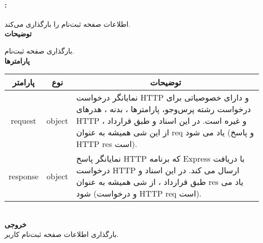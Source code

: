 \paragraph{:}
اطلاعات صفحه ثبت‌نام را بارگذاری می‌کند.
\\
\textbf{توضیحات}
\hr
\begin{flushleft}
	\framebox[.9\textwidth][l]{
		\lr{
			\textcolor{type}{void}
			\textcolor{func}{getRegister}
			\textcolor{symb}{(}
			\textcolor{type}{object}
			\textcolor{arg}{request}
			\textcolor{symb}{,}
			\textcolor{type}{object}
			\textcolor{arg}{response}
			\textcolor{symb}{);}
		}
	}
\end{flushleft}
بارگذاری صفحه ثبت‌نام. 
\\
\textbf{پارامترها}
\hr \\[10pt]
\begin{tabular}{|m{4cm}|m{3cm}|m{10cm}|}
	\hline
	\multicolumn{1}{|c}{پارامتر}
	&
	\multicolumn{1}{|c}{نوع}
	&
	\multicolumn{1}{|c|}{توضیحات}
	\\
	\hline
	\multicolumn{1}{|c}{request}
	&
	\multicolumn{1}{|c|}{object}
	&
	نمایانگر درخواست HTTP و دارای خصوصیاتی برای درخواست رشته پرس‌و‌جو، پارامترها ، بدنه ، هدرهای HTTP و غیره است.
	در این اسناد و طبق قرارداد ، از این شی همیشه به عنوان req یاد می شود (و پاسخ HTTP res است).
	\\
	\hline
	\multicolumn{1}{|c}{response}
	&
	\multicolumn{1}{|c|}{object}
	&
	نمایانگر پاسخ HTTP که برنامه Express با دریافت درخواست HTTP ارسال می کند.
	در این اسناد و طبق قرارداد ، از شی همیشه به عنوان res یاد می شود (و درخواست HTTP req است).
	\\
	\hline
\end{tabular}
\\[10pt]
\textbf{خروجی}
\hr \\
بارگذاری اطلاعات صفحه ثبت‌نام کاربر. 

